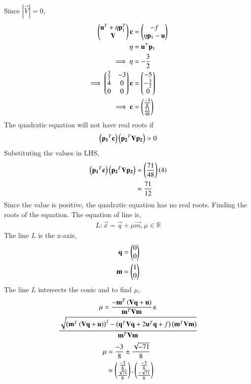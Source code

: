 Since $|\vec{V}| = 0$,
\begin{align}
    \begin{pmatrix}\mathbf{u}^T+\eta \mathbf{p}_1^T \\ \mathbf{V}\end{pmatrix}\mathbf{c} &= \begin{pmatrix}-f \\ \eta \mathbf{p}_1-\mathbf{u}\end{pmatrix}\\
    \eta &= \mathbf{u}^\top \mathbf{p}_1\\
    \implies \eta &= -\frac{3}{2}\\
    \implies \begin{pmatrix}\frac{3}{2} & -3 \\ 4 & 0 \\ 0 & 0\end{pmatrix}\mathbf{c} &= \begin{pmatrix}-5 \\ -\frac{3}{2} \\ 0\end{pmatrix}\\
    \implies \mathbf{c} &= \begin{pmatrix}\frac{-3}{8}\\\frac{71}{48}\end{pmatrix}
\end{align}
The quadratic equation will not have real roots if
\begin{align}
    \left(\mathbf{p_1}^T\mathbf{c}\right)\left(\mathbf{p_2}^T\mathbf{V}\mathbf{p_2}\right) > 0
\end{align}
Substituting the values in LHS,
\begin{align}
    \left(\mathbf{p_1}^T\mathbf{c}\right)\left(\mathbf{p_2}^T\mathbf{V}\mathbf{p_2}\right) &= \left(\frac{71}{48}\right)\left(4\right)\\
    &= \frac{71}{12}
\end{align}
Since the value is positive, the quadratic equation has no real roots. Finding the roots of the equation. The equation of line is,
\begin{align}
    L : \vec{x} = \vec{q} + \mu\vec{m}, \mu \in \mathbb{R}
\end{align}
The line $L$ is the x-axis,
\begin{align}
    \mathbf{q} = \begin{pmatrix}0 \\ 0\end{pmatrix}\\
    \mathbf{m} = \begin{pmatrix}1 \\ 0\end{pmatrix}
\end{align}
The line $L$ intersects the conic and to find $\mu$,
\begin{multline}
    \mu = \frac{-\mathbf{m}^T \left(\mathbf{V}\mathbf{q} + \mathbf{u}\right)}{\mathbf{m}^T\mathbf{V}\mathbf{m}} \pm \\ \frac{\sqrt{\left(\mathbf{m}^T\left(\mathbf{V}\mathbf{q} + \mathbf{u}\right)\right)^2 - \left(\mathbf{q}^T\mathbf{V}\mathbf{q} + 2\mathbf{u}^T\mathbf{q} + f\right)\left(\mathbf{m}^T\mathbf{V}\mathbf{m}\right)}}{\mathbf{m}^T\mathbf{V}\mathbf{m}}
\end{multline}
\begin{align}
    \mu &= \frac{-3}{8} \pm \frac{\sqrt{-71}}{8}\\
    &= \begin{pmatrix}\frac{-3}{8} \\ \frac{\sqrt{71}}{8}\end{pmatrix}, \begin{pmatrix}\frac{-3}{8} \\ \frac{-\sqrt{71}}{8}\end{pmatrix}
\end{align}
